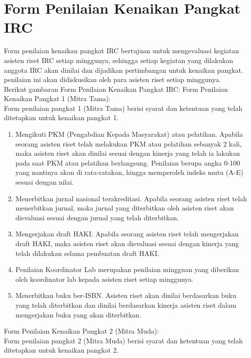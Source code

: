 \chapter{Form Penilaian Kenaikan Pangkat IRC}
\par
Form penilaian kenaikan pangkat IRC bertujuan untuk mengevaluasi kegiatan asisten riset IRC setiap minggunya, sehingga setiap kegiatan yang dilakukan anggota IRC akan dinilai dan dijadikan pertimbangan untuk kenaikan pangkat. penilaian ini akan didiskusikan oleh para asisten riset setiap minggunya.\\
Berikut gambaran Form Penilaian Kenaikan Pangkat IRC:
Form Penilaian Kenaikan Pangkat 1 (Mitra Tama):\\
Form penilaian pangkat 1 (Mitra Tama) berisi syarat dan ketentuan yang telah ditetapkan untuk kenaikan pangkat 1.\\
\begin{enumerate}
 \item Mengikuti PKM (Pengabdian Kepada Masyarakat) atau pelatihan. Apabila seorang asisten riset telah melakukan PKM atau pelatihan sebanyak 2 kali, maka asisten riset akan dinilai sesuai dengan kinerja yang telah ia lakukan pada saat PKM atau pelatihan berlangsung. Penilaian berupa angka 0-100 yang nantinya akan di rata-ratakan, hingga memperoleh indeks mutu (A-E) sesuai dengan nilai.
 \item Menerbitkan jurnal nasional terakreditasi. Apabila seorang asisten riset telah menerbitkan jurnal, maka jurnal yang diterbitkan oleh asisten riset akan dievaluasi sesuai dengan jurnal yang telah diterbitkan.
 \item Mengerjakan draft HAKI. Apabila seorang asisten riset telah mengerjakan draft HAKI, maka asisten riset akan dievaluasi sesuai dengan kinerja yang telah  dilakukan selama pembuatan draft HAKI.
 \item Penilaian Koordinator Lab merupakan penilaian mingguan yang diberikan oleh koordinator lab kepada asisten riset setiap minggunya.
 \item Menerbitkan buku ber-ISBN. Asisten riset akan dinilai berdasarkan buku yang telah diterbitkan dan dinilai berdasarkan kinerja asisten riset dalam mengerjakan buku yang akan diterbitkan.
\end{enumerate}
Form Penilaian Kenaikan Pangkat 2 (Mitra Muda):\\
Form penilaian pangkat 2 (Mitra Muda) berisi syarat dan ketentuan yang telah ditetapkan untuk kenaikan pangkat 2.\\
